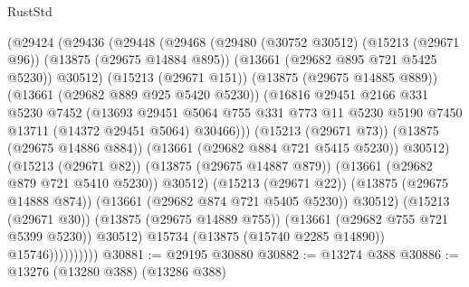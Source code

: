 \begin{lexlean}{RustStd}
\begin{coremodule}
                          (@29424
                            (@29436
                              (@29448
                                (@29468
                                  (@29480
                                    (@30752 @30512)
                                    (@15213 (@29671 @96))
                                    (@13875 (@29675 @14884 @895))
                                    (@13661 (@29682 @895 @721 @5425 @5230))
                                    @30512)
                                  (@15213 (@29671 @151))
                                  (@13875 (@29675 @14885 @889))
                                  (@13661 (@29682 @889 @925 @5420 @5230))
                                  (@16816
                                    @29451
                                    @2166
                                    @331
                                    @5230
                                    @7452
                                    (@13693
                                      @29451
                                      @5064
                                      @755
                                      @331
                                      @773
                                      @11
                                      @5230
                                      @5190
                                      @7450
                                      @13711
                                      (@14372 @29451 @5064)
                                      @30466)))
                                (@15213 (@29671 @73))
                                (@13875 (@29675 @14886 @884))
                                (@13661 (@29682 @884 @721 @5415 @5230))
                                @30512)
                              (@15213 (@29671 @82))
                              (@13875 (@29675 @14887 @879))
                              (@13661 (@29682 @879 @721 @5410 @5230))
                              @30512)
                            (@15213 (@29671 @22))
                            (@13875 (@29675 @14888 @874))
                            (@13661 (@29682 @874 @721 @5405 @5230))
                            @30512)
                          (@15213 (@29671 @30))
                          (@13875 (@29675 @14889 @755))
                          (@13661 (@29682 @755 @721 @5399 @5230))
                          @30512)
                        @15734
                        (@13875 (@15740 @2285 @14890))
                        @15746))))))))))
@30881 := @29195 @30880
@30882 := @13274 @388
@30886 := @13276 (@13280 @388) (@13286 @388)

\end{coremodule}
\end{lexlean}
